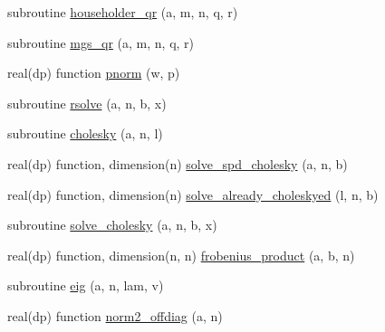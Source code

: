 \begin{DoxyCompactItemize}
\item 
subroutine \hyperlink{classmatrix__module_ac88cca09a0310ee3f4f32c86f6aac9e6}{householder\-\_\-qr} (a, m, n, q, r)
\item 
subroutine \hyperlink{classmatrix__module_a5500c11609ac1e842fde5f050c9c031b}{mgs\-\_\-qr} (a, m, n, q, r)
\item 
real(dp) function \hyperlink{classmatrix__module_af5657071f15da28fea495d7644a36398}{pnorm} (w, p)
\item 
subroutine \hyperlink{classmatrix__module_ae47e43dd7d7b9e43d81bf6128af52b02}{rsolve} (a, n, b, x)
\item 
subroutine \hyperlink{classmatrix__module_addfed84dcfeb9340921b94a7952f3c39}{cholesky} (a, n, l)
\item 
real(dp) function, dimension(n) \hyperlink{classmatrix__module_a1f13e0a78a85e9bcfa4c2ec3c94952db}{solve\-\_\-spd\-\_\-cholesky} (a, n, b)
\item 
real(dp) function, dimension(n) \hyperlink{classmatrix__module_a18bdcc900cdfd05db1978a8ab2d532a2}{solve\-\_\-already\-\_\-choleskyed} (l, n, b)
\item 
subroutine \hyperlink{classmatrix__module_a6125425b4483c40b89354347000cbcd1}{solve\-\_\-cholesky} (a, n, b, x)
\item 
real(dp) function, dimension(n, n) \hyperlink{classmatrix__module_abc2c427f09eeadbff74f7f2bab79d950}{frobenius\-\_\-product} (a, b, n)
\item 
subroutine \hyperlink{classmatrix__module_a0aed5ffb6e05b3425093d49b7b08a084}{eig} (a, n, lam, v)
\item 
real(dp) function \hyperlink{classmatrix__module_a46361b935590ba828408a945af33fae0}{norm2\-\_\-offdiag} (a, n)
\end{DoxyCompactItemize}


